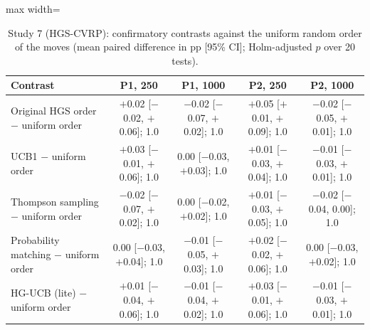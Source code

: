 \begin{table}[t]
\caption{Study 7 (HGS-CVRP): confirmatory contrasts against the uniform random order of the moves (mean paired difference in pp [95\% CI]; Holm-adjusted $p$ over 20 tests).}\label{tab:s7tests}
\centering
\small
\begin{adjustbox}{max width=\linewidth}
\begin{tabular}{lcccc}
\toprule
Contrast & P1, 250 & P1, 1000 & P2, 250 & P2, 1000 \\
\midrule
Original HGS order $-$ uniform order & $+$0.02 [$-$0.02, $+$0.06]; 1.0 & $-$0.02 [$-$0.07, $+$0.02]; 1.0 & $+$0.05 [$+$0.01, $+$0.09]; 1.0 & $-$0.02 [$-$0.05, $+$0.01]; 1.0 \\
UCB1 $-$ uniform order & $+$0.03 [$-$0.01, $+$0.06]; 1.0 & 0.00 [$-$0.03, $+$0.03]; 1.0 & $+$0.01 [$-$0.03, $+$0.04]; 1.0 & $-$0.01 [$-$0.03, $+$0.01]; 1.0 \\
Thompson sampling $-$ uniform order & $-$0.02 [$-$0.07, $+$0.02]; 1.0 & 0.00 [$-$0.02, $+$0.02]; 1.0 & $+$0.01 [$-$0.03, $+$0.05]; 1.0 & $-$0.02 [$-$0.04, 0.00]; 1.0 \\
Probability matching $-$ uniform order & 0.00 [$-$0.03, $+$0.04]; 1.0 & $-$0.01 [$-$0.05, $+$0.03]; 1.0 & $+$0.02 [$-$0.02, $+$0.06]; 1.0 & 0.00 [$-$0.03, $+$0.02]; 1.0 \\
HG-UCB (lite) $-$ uniform order & $+$0.01 [$-$0.04, $+$0.06]; 1.0 & $-$0.01 [$-$0.04, $+$0.02]; 1.0 & $+$0.03 [$-$0.01, $+$0.06]; 1.0 & $-$0.01 [$-$0.03, $+$0.01]; 1.0 \\
\bottomrule
\end{tabular}
\end{adjustbox}
\end{table}
